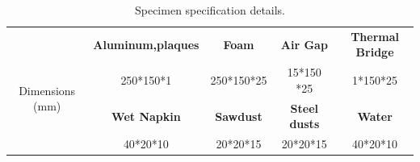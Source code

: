 \documentclass{tQRT2e}
\begin{document}
\begin{table}
	\centering

	\caption{Specimen specification details.}
	\begin{tabular}{c|c|c|c|c}
		\hline
		& \textbf{Aluminum,plaques} & \textbf{Foam}       & \textbf{Air Gap}     & \textbf{Thermal Bridge} \\ \cline{2-5} 
		\multirow{2}{*}{Dimensions (mm)} & 250*150*1        & 250*150*25 & 15*150 *25  & 1*150*25       \\ \cline{2-5} 
		& \textbf{Wet Napkin}       & \textbf{Sawdust}    & \textbf{Steel dusts} & \textbf{Water}          \\ \cline{2-5} 
		& 40*20*10         & 20*20*15   & 20*20*15    & 40*20*10       \\ \hline
	\end{tabular}
	\label{Tab_spe}
\end{table}
\end{document}
